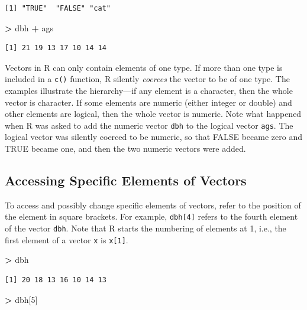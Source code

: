 \documentclass[]{krantz}
\makeatletter
\newenvironment{Shaded}{\begin{snugshade}}{\end{snugshade}}
\newcommand{\DecValTok}[1]{\textcolor[rgb]{0.06,0.06,0.06}{#1}}
\newcommand{\StringTok}[1]{\textcolor[rgb]{0.5,0.5,0.5}{#1}}
\newcommand{\OperatorTok}[1]{\textcolor[rgb]{0.43,0.43,0.43}{\textbf{#1}}}
\newcommand{\NormalTok}[1]{#1}
\newenvironment{kframe}{%
\medskip{}
\setlength{\fboxsep}{.8em}
 \def\at@end@of@kframe{}%
 \ifinner\ifhmode%
  \def\at@end@of@kframe{\end{minipage}}%
  \begin{minipage}{\columnwidth}%
 \fi\fi%
 \def\FrameCommand##1{\hskip\@totalleftmargin \hskip-\fboxsep
 \colorbox{shadecolor}{##1}\hskip-\fboxsep
     \hskip-\linewidth \hskip-\@totalleftmargin \hskip\columnwidth}%
 \MakeFramed {\advance\hsize-\width
   \@totalleftmargin\z@ \linewidth\hsize
   \@setminipage}}%
 {\par\unskip\endMakeFramed%
 \at@end@of@kframe}
\renewenvironment{Shaded}{\begin{kframe}}{\end{kframe}}
\theoremstyle{definition}
\theoremstyle{definition}
\theoremstyle{definition}
\theoremstyle{remark}
\makeatother
\begin{document}
\begin{verbatim}
[1] "TRUE"  "FALSE" "cat"  
\end{verbatim}

\begin{Shaded}
\begin{Highlighting}[]
\OperatorTok{>}\StringTok{ }\NormalTok{dbh }\OperatorTok{+}\StringTok{ }\NormalTok{ags}
\end{Highlighting}
\end{Shaded}

\begin{verbatim}
[1] 21 19 13 17 10 14 14
\end{verbatim}

Vectors in R can only contain elements of one type. If more than one
type is included in a \texttt{c()} function, R silently \emph{coerces}
the vector to be of one type. The examples illustrate the hierarchy---if
any element is a character, then the whole vector is character. If some
elements are numeric (either integer or double) and other elements are
logical, then the whole vector is numeric. Note what happened when R was
asked to add the numeric vector \texttt{dbh} to the logical vector
\texttt{ags}. The logical vector was silently coerced to be numeric, so
that FALSE became zero and TRUE became one, and then the two numeric
vectors were added.

\subsection{Accessing Specific Elements of
Vectors}\label{accessing-specific-elements-of-vectors}

To access and possibly change specific elements of vectors, refer to the
position of the element in square brackets. For example,
\texttt{dbh{[}4{]}} refers to the fourth element of the vector
\texttt{dbh}. Note that R starts the numbering of elements at 1, i.e.,
the first element of a vector \texttt{x} is \texttt{x{[}1{]}}.

\begin{Shaded}
\begin{Highlighting}[]
\OperatorTok{>}\StringTok{ }\NormalTok{dbh}
\end{Highlighting}
\end{Shaded}

\begin{verbatim}
[1] 20 18 13 16 10 14 13
\end{verbatim}

\begin{Shaded}
\begin{Highlighting}[]
\OperatorTok{>}\StringTok{ }\NormalTok{dbh[}\DecValTok{5}\NormalTok{]}
\end{Highlighting}
\end{Shaded}
\end{document}
